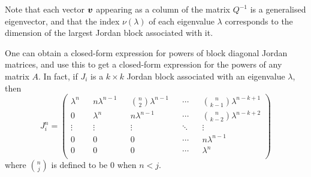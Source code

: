 Note that each vector $\boldsymbol{v}$ appearing as a column of the
matrix $Q^{-1}$ is a generalised eigenvector, and that the
index $\nu(\lambda)$ of each eigenvalue $\lambda$ corresponds to the
dimension of the largest Jordan block associated with it.

One can obtain a closed-form expression for powers of block diagonal
Jordan matrices, and use this to get a closed-form expression for
the powers of any matrix $A$. In fact, if $J_{i}$ is a
$k\times k$ Jordan block associated with an eigenvalue $\lambda$,
then
\begin{equation}
\label{eq:jordan_powers}
J_{i}^{n}=\begin{pmatrix}
\lambda^{n}	&&	n\lambda^{n-1}	&&	{n\choose 2}\lambda^{n-1}	&&
\cdots		&&	{n\choose k-1}\lambda^{n-k+1}				\\
0			&&	\lambda^{n}		&&	n\lambda^{n-1}				&&
\cdots		&&	{n\choose k-2}\lambda^{n-k+2}				\\
\vdots	&&	\vdots	&&	\vdots	&&	\ddots	&&	\vdots			\\
0		&&	0		&&	0		&&	\cdots	&&	n\lambda^{n-1}	\\
0		&&	0		&&	0		&&	\cdots	&&	\lambda^{n}		\\
\end{pmatrix}
\end{equation}
where ${n\choose j}$ is defined to be $0$ when $n<j$.
